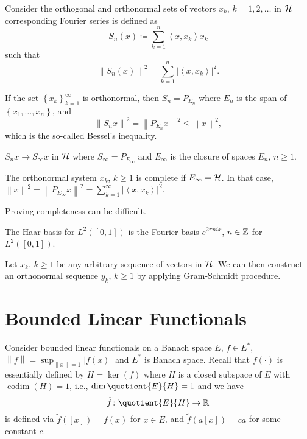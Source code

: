 Consider the orthogonal and orthonormal sets of vectors \(x_k\), \(k = 1, 2, \ldots  \) in \(\mathcal{\MakeUppercase{h}} \) corresponding Fourier series is defined as
\[
	S_n(x) \coloneqq \sum_{k=1} ^n \left\langle x, x_k \right\rangle x_k
\]
such that
\[
	\left\lVert S_n(x)\right\rVert ^{2} = \sum_{k=1}^n \left\vert \left\langle x, x_k \right\rangle  \right\vert ^{2}.
\]

If the set \(\left\{ x_k \right\} _{k=1}^{\infty} \) is orthonormal, then \(S_n = P_{E_n}\) where \(E_n\) is the span of \(\left\{ x_1, \ldots , x_n  \right\} \), and
\[
	\left\lVert S_n x\right\rVert ^{2} = \left\lVert P_{E_n}x\right\rVert ^{2} \leq \left\lVert x\right\rVert ^{2},
\]
which is the so-called Bessel's inequality.

\begin{remark}
	\(S_n x \to S_\infty x\) in \(\mathcal{\MakeUppercase{h}} \) where \(S_\infty = P_{E_\infty }\) and \(E_\infty \) is the closure of spaces \(E_n\), \(n \geq 1\).
\end{remark}

The orthonormal system \(x_k\), \(k \geq 1\) is complete if \(E_\infty = \mathcal{\MakeUppercase{h}}\). In that case, \(\left\lVert x\right\rVert ^{2} = \left\lVert P_{E_\infty }x\right\rVert ^{2} = \sum_{k=1}^{\infty} \left\vert \left\langle x, x_k \right\rangle  \right\vert ^{2} \).

\begin{remark}
	Proving completeness can be difficult.
\end{remark}

\begin{eg}
	The Haar basis for \(L^2([0, 1])\) is the Fourier basis \(e^{2\pi ni x}\), \(n \in \mathbb{\MakeUppercase{z}} \) for \(L^2([0, 1])\).
\end{eg}
\begin{explanation}
	Let \(x_k\), \(k \geq 1\) be any arbitrary sequence of vectors in \(\mathcal{\MakeUppercase{h}} \). We can then construct an orthonormal sequence \(y_k\), \(k \geq 1\) by applying Gram-Schmidt procedure.
\end{explanation}

\section{Bounded Linear Functionals}
Consider bounded linear functionals on a Banach space \(E\), \(f\in E^{\ast} \), \(\left\lVert f\right\rVert = \sup _{\left\lVert x\right\rVert = 1}\left\vert f(x) \right\vert \) and \(E^{\ast} \) is Banach space. Recall that \(f(\cdot)\) is essentially defined by \(H = \ker(f)\) where \(H\) is a closed subspace of \(E\) with \(\mathop{\mathrm{codim}}(H) = 1\), i.e., \(\dim \quotient{E}{H} = 1 \) and we have
\[
	\widetilde{f} \colon \quotient{E}{H} \to \mathbb{\MakeUppercase{r}}
\]
is defined via \(\widetilde{f} ([x]) = f(x)\) for \(x\in E\), and \(\widetilde{f} (a[x]) = ca\)  for some constant \(c\).

